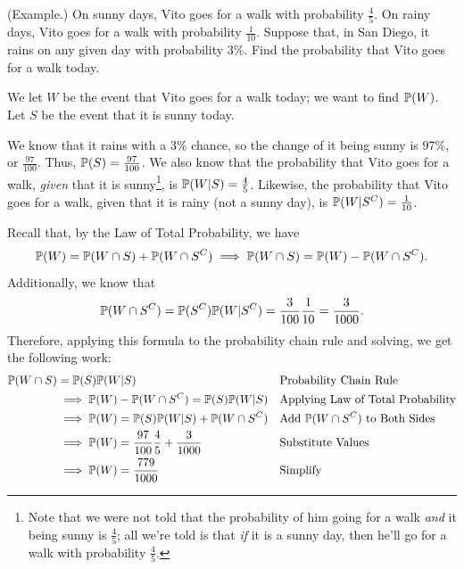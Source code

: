 \begin{mdframed}[nobreak=true]
    (Example.) On sunny days, Vito goes for a walk with probability $\frac{4}{5}$. On rainy days, Vito goes for a walk with probability $\frac{1}{10}$. Suppose that, in San Diego, it rains on any given day with probability $3\%$. Find the probability that Vito goes for a walk today. 

    \begin{mdframed}[]
        We let $W$ be the event that Vito goes for a walk today; we want to find $\mathbb{P}(W)$. Let $S$ be the event that it is sunny today.

        \bigskip 

        We know that it rains with a $3\%$ chance, so the change of it being sunny is $97\%$, or $\frac{97}{100}$. Thus, $\mathbb{P}(S) = \frac{97}{100}$. We also know that the probability that Vito goes for a walk, \emph{given} that it is sunny\footnote{Note that we were not told that the probability of him going for a walk \emph{and} it being sunny is $\frac{4}{5}$; all we're told is that \emph{if} it is a sunny day, then he'll go for a walk with probability $\frac{4}{5}$.}, is $\mathbb{P}(W | S) = \frac{4}{5}$. Likewise, the probability that Vito goes for a walk, given that it is rainy (not a sunny day), is $\mathbb{P}(W | S^C) = \frac{1}{10}$. 

        \bigskip 

        Recall that, by the Law of Total Probability, we have 
        \[\mathbb{P}(W) = \mathbb{P}(W \cap S) + \mathbb{P}(W \cap S^C) \implies \mathbb{P}(W \cap S) = \mathbb{P}(W) - \mathbb{P}(W \cap S^C).\]
        Additionally, we know that 
        \[\mathbb{P}(W \cap S^C) = \mathbb{P}(S^C) \mathbb{P}(W | S^C) = \frac{3}{100} \frac{1}{10} = \frac{3}{1000}.\]
        Therefore, applying this formula to the probability chain rule and solving, we get the following work: 
        \begin{equation*}
            \begin{aligned}
                \mathbb{P}(W \cap S) &= \mathbb{P}(S) \mathbb{P}(W | S) && \text{Probability Chain Rule}\\ 
                    &\implies \mathbb{P}(W) - \mathbb{P}(W \cap S^C) = \mathbb{P}(S) \mathbb{P}(W | S) && \text{Applying Law of Total Probability} \\ 
                    &\implies \mathbb{P}(W) = \mathbb{P}(S) \mathbb{P}(W | S) + \mathbb{P}(W \cap S^C) && \text{Add } \mathbb{P}(W \cap S^C) \text{ to Both Sides}\\ 
                    &\implies \mathbb{P}(W) = \frac{97}{100} \frac{4}{5} + \frac{3}{1000} && \text{Substitute Values} \\ 
                    &\implies \mathbb{P}(W) = \frac{779}{1000} && \text{Simplify}
            \end{aligned}
        \end{equation*}
    \end{mdframed}
\end{mdframed}

